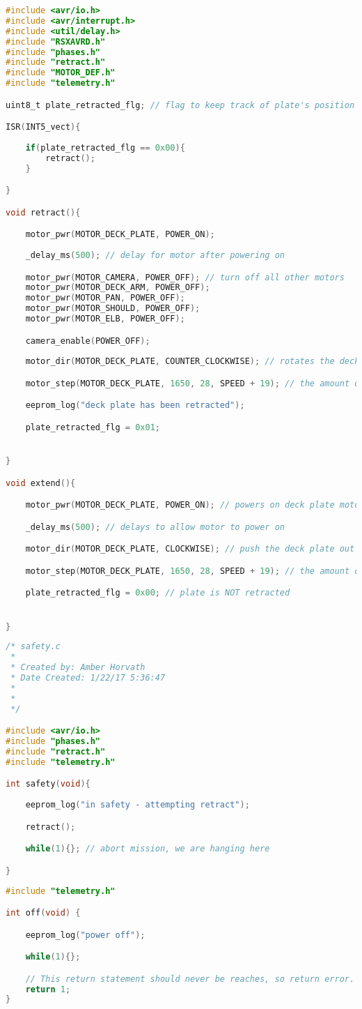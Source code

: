 \begin{lstlisting}[language=C]
#include <avr/io.h>
#include <avr/interrupt.h>
#include <util/delay.h>
#include "RSXAVRD.h"
#include "phases.h"
#include "retract.h"
#include "MOTOR_DEF.h"
#include "telemetry.h"

uint8_t plate_retracted_flg; // flag to keep track of plate's position

ISR(INT5_vect){
	
	if(plate_retracted_flg == 0x00){
		retract();
	}

}

void retract(){ 

	motor_pwr(MOTOR_DECK_PLATE, POWER_ON);
	
	_delay_ms(500); // delay for motor after powering on

	motor_pwr(MOTOR_CAMERA, POWER_OFF); // turn off all other motors
	motor_pwr(MOTOR_DECK_ARM, POWER_OFF);
	motor_pwr(MOTOR_PAN, POWER_OFF);
	motor_pwr(MOTOR_SHOULD, POWER_OFF);
	motor_pwr(MOTOR_ELB, POWER_OFF);

	camera_enable(POWER_OFF); 
	
	motor_dir(MOTOR_DECK_PLATE, COUNTER_CLOCKWISE); // rotates the deck plate to 

	motor_step(MOTOR_DECK_PLATE, 1650, 28, SPEED + 19); // the amount of steps needed to pull the arm back in

	eeprom_log("deck plate has been retracted");

	plate_retracted_flg = 0x01;


}

void extend(){

	motor_pwr(MOTOR_DECK_PLATE, POWER_ON); // powers on deck plate motor

	_delay_ms(500); // delays to allow motor to power on

	motor_dir(MOTOR_DECK_PLATE, CLOCKWISE); // push the deck plate out

	motor_step(MOTOR_DECK_PLATE, 1650, 28, SPEED + 19); // the amount of steps needed to move the deck plate at a good speed

	plate_retracted_flg = 0x00; // plate is NOT retracted


}
\end{lstlisting}
\begin{lstlisting}[language=C]
/* safety.c
 * 
 * Created by: Amber Horvath
 * Date Created: 1/22/17 5:36:47
 *
 *
 */

#include <avr/io.h>
#include "phases.h"
#include "retract.h"
#include "telemetry.h"

int safety(void){
    
	eeprom_log("in safety - attempting retract");

    retract();

    while(1){}; // abort mission, we are hanging here

}
\end{lstlisting}
\begin{lstlisting}[language=C]
#include "telemetry.h"

int off(void) {

	eeprom_log("power off");

	while(1){};

	// This return statement should never be reaches, so return error.
	return 1;
}
\end{lstlisting}
